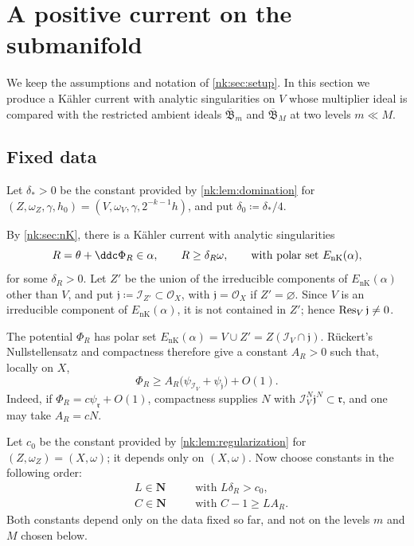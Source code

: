 \section{A positive current on the submanifold}\label{nk:sec:positive-current}

We keep the assumptions and notation of \cref{nk:sec:setup}. In this section
we produce a K\"ahler current with analytic singularities on $V$ whose
multiplier ideal is compared with the restricted ambient ideals
$\overline{\mathfrak B}_m$ and $\overline{\mathfrak B}_M$ at two levels $m\ll M$.

\subsection{Fixed data}\label{nk:sec:fixed-data}

Let $\delta_*>0$ be the constant provided by \cref{nk:lem:domination}
for $(Z,\omega_Z,\gamma,h_0)=(V,\omega_V,\gamma,2^{-k-1}h)$, and put
$\delta_0\coloneqq \delta_*/4$.

By \cref{nk:sec:nK}, there is a K\"ahler current with analytic singularities
\begin{equation}\label{nk:eq:def-R}
  R=\theta+\ddc\Phi_R\in\alpha,\qquad R\ge\delta_R\omega,\qquad
  \text{with polar set }{E_{\mathrm{nK}}}(\alpha),
\end{equation}
for some $\delta_R>0$. Let $Z'$ be the union of the irreducible
components of ${E_{\mathrm{nK}}}(\alpha)$ other than $V$, and put
$\mathfrak j\coloneqq \mathcal I_{Z'}\subset\mathcal O_X$,
with $\mathfrak j=\mathcal O_X$ if $Z'=\varnothing$. Since $V$ is an
irreducible component of ${E_{\mathrm{nK}}}(\alpha)$, it is not contained in $Z'$;
hence $\operatorname{Res}_{V}\mathfrak j\ne0$.

The potential $\Phi_R$ has polar set
${E_{\mathrm{nK}}}(\alpha)=V\cup Z'=Z(\mathcal I_V\cap\mathfrak j)$. R\"uckert's
Nullstellensatz \cite[Chapter~II, Theorem~4.22]{DemCADG} and compactness therefore give
a constant $A_R>0$ such that, locally on $X$,
\begin{equation}\label{nk:eq:PhiR-lower}
  \Phi_R\ge A_R\bigl(\psi_{\mathcal I_V}+\psi_{\mathfrak j}\bigr)+O(1).
\end{equation}
Indeed, if $\Phi_R=c\psi_{\mathfrak r}+O(1)$, compactness supplies
$N$ with $\mathcal I_V^N\mathfrak j^N\subset\mathfrak r$, and one may
take $A_R=cN$.

Let $c_0$ be the constant provided by \cref{nk:lem:regularization} for
$(Z,\omega_Z)=(X,\omega)$; it depends only on $(X,\omega)$. Now
choose constants in the following order:
\begin{equation}\label{nk:eq:constants}
  \begin{alignedat}{2}
  &L\in\mathbf N &&\quad\text{with }L\delta_R>c_0,\\
  &C\in\mathbf N &&\quad\text{with }C-1\ge LA_R.
  \end{alignedat}
\end{equation}
Both constants depend only on the data fixed so far, and not on the
levels $m$ and $M$ chosen below.


